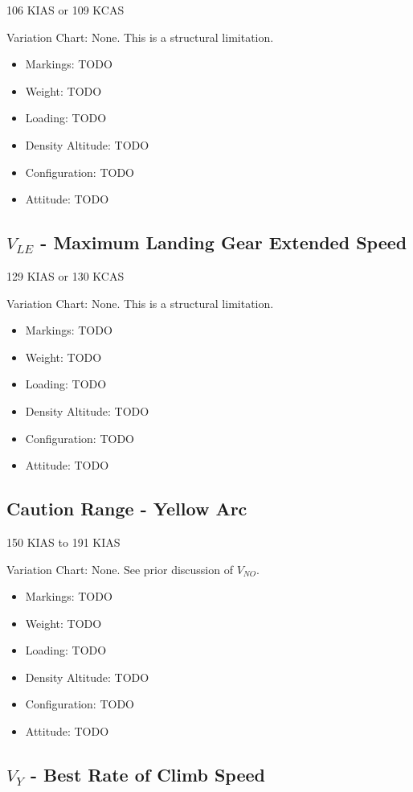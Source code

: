 106 KIAS or 109 KCAS

Variation Chart: None. This is a structural limitation.

\begin{itemize}
\item Markings: TODO
\item Weight: TODO
\item Loading: TODO
\item Density Altitude: TODO
\item Configuration: TODO
\item Attitude: TODO
\end{itemize}

\subsection{$V_{LE}$ - Maximum Landing Gear Extended Speed}

129 KIAS or 130 KCAS

Variation Chart: None. This is a structural limitation.

\begin{itemize}
\item Markings: TODO
\item Weight: TODO
\item Loading: TODO
\item Density Altitude: TODO
\item Configuration: TODO
\item Attitude: TODO
\end{itemize}

\subsection{Caution Range - Yellow Arc}

150 KIAS to 191 KIAS

Variation Chart: None. See prior discussion of $V_{NO}$.

\begin{itemize}
\item Markings: TODO
\item Weight: TODO
\item Loading: TODO
\item Density Altitude: TODO
\item Configuration: TODO
\item Attitude: TODO
\end{itemize}

\subsection{$V_Y$ - Best Rate of Climb Speed}

